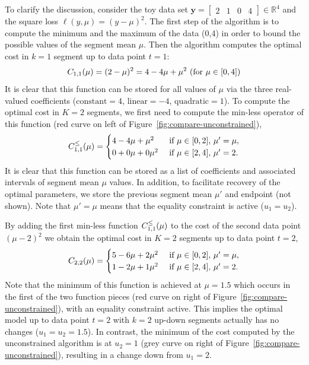 \documentclass{article}
\newcommand{\RR}{\mathbb R}
\begin{document}
To clarify the discussion, consider the 
toy data set $\mathbf y= \left[
\begin{array}{cccccc}
  2 & 1 & 0 & 4
\end{array}
\right] \in\RR^4$ and the square loss $\ell(y,\mu)=(y-\mu)^2$. The first
step of the algorithm is to compute the minimum and the maximum of the
data (0,4) in order to bound the possible values of the segment
mean $\mu$. Then the algorithm computes the optimal cost in $k=1$ segment up
to data point $t=1$:
\begin{equation}
  C_{1,1}(\mu) = (2-\mu)^2=4 - 4\mu + \mu^2\text{ (for $\mu\in[0,4]$)}
\end{equation}
It is clear that this function can be stored for all values of $\mu$ via
the three real-valued coefficients ($\text{constant}=4$,
$\text{linear}=-4$, $\text{quadratic}=1$). To compute the optimal cost
in $K=2$ segments, we first need to compute the min-less operator of
this function (red curve on left of Figure~\ref{fig:compare-unconstrained}),
\begin{equation}
  C_{1,1}^\leq(\mu) =
  \begin{cases}
    4 - 4\mu + \mu^2 &\text{ if }\mu\in[0,2],\, \mu'=\mu,\\
    0 + 0\mu + 0\mu^2 & \text{ if }\mu\in[2,4],\,  \mu'=2.
  \end{cases}
\end{equation}
It is clear that this function can be stored as a list of
coefficients and associated intervals of segment mean $\mu$ values.
In addition, to facilitate recovery of the optimal parameters, we
store the previous segment mean $\mu'$ and endpoint (not shown). Note
that $\mu'=\mu$ means that the equality constraint is active
($u_1=u_2$).

By adding the first min-less function $C_{1,1}^\leq(\mu)$ to the
cost of the second data point $(\mu-2)^2$ we obtain the optimal cost in $K=2$
segments up to data point $t=2$,
\begin{equation}
  C_{2,2}(\mu) = 
  \begin{cases}
    5 - 6\mu + 2\mu^2 &\text{ if }\mu\in[0,2],\,  \mu'=\mu,\\
    1 - 2\mu + 1\mu^2 &\text{ if }\mu\in[2,4],\,  \mu'=2.
  \end{cases}
\end{equation}
Note that the minimum of this function is achieved at $\mu=1.5$ which
occurs in the first of the two function pieces (red curve on right of
Figure~\ref{fig:compare-unconstrained}), with an equality constraint
active. This implies the optimal model up to data point $t=2$ with
$k=2$ up-down segments actually has no changes ($u_1=u_2=1.5$). In
contrast, the minimum of the cost computed by the unconstrained
algorithm is at $u_2=1$ (grey curve on right of
Figure~\ref{fig:compare-unconstrained}), resulting in a change down
from $u_1=2$.
\end{document}
